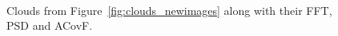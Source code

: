 \documentclass[11pt,preprint]{aastex}
\begin{document}
\begin{figure}[htpb]
\centering
{} \\
\caption{{\small
Clouds from Figure~\ref{fig:clouds_newimages} along with their FFT, PSD and ACovF.}}
\label{fig:clouds_newimages_dat}
\end{figure}
\end{document}
